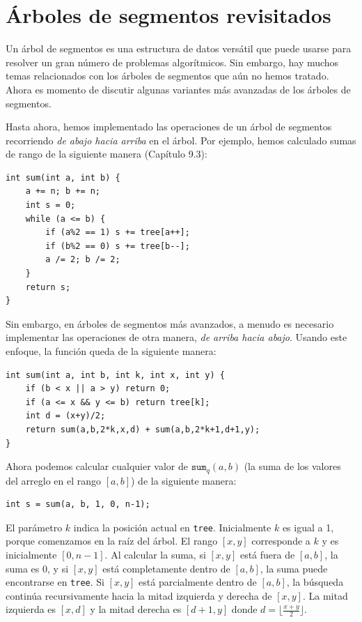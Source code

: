 \chapter{Árboles de segmentos revisitados}


Un árbol de segmentos es una estructura de datos versátil
que puede usarse para resolver un gran número de problemas algorítmicos.
Sin embargo, hay muchos temas relacionados con los árboles de segmentos
que aún no hemos tratado.
Ahora es momento de discutir algunas variantes más avanzadas
de los árboles de segmentos.

Hasta ahora, hemos implementado las operaciones
de un árbol de segmentos recorriendo \emph{de abajo hacia arriba}
en el árbol.
Por ejemplo, hemos calculado
sumas de rango de la siguiente manera (Capítulo 9.3):

\begin{lstlisting}
int sum(int a, int b) {
    a += n; b += n;
    int s = 0;
    while (a <= b) {
        if (a%2 == 1) s += tree[a++];
        if (b%2 == 0) s += tree[b--];
        a /= 2; b /= 2;
    }
    return s;
}
\end{lstlisting}

Sin embargo, en árboles de segmentos más avanzados,
a menudo es necesario implementar las operaciones
de otra manera, \emph{de arriba hacia abajo}.
Usando este enfoque, la función queda de la siguiente manera:
\begin{lstlisting}
int sum(int a, int b, int k, int x, int y) {
    if (b < x || a > y) return 0;
    if (a <= x && y <= b) return tree[k];
    int d = (x+y)/2;
    return sum(a,b,2*k,x,d) + sum(a,b,2*k+1,d+1,y);
}
\end{lstlisting}

Ahora podemos calcular cualquier valor de $\texttt{sum}_q(a,b)$
(la suma de los valores del arreglo en el rango $[a,b]$) de la siguiente manera:
\begin{lstlisting}
int s = sum(a, b, 1, 0, n-1);
\end{lstlisting}

El parámetro $k$ indica la posición actual
en \texttt{tree}.
Inicialmente $k$ es igual a 1, porque comenzamos
en la raíz del árbol.
El rango $[x,y]$ corresponde a $k$
y es inicialmente $[0,n-1]$.
Al calcular la suma,
si $[x,y]$ está fuera de $[a,b]$,
la suma es 0,
y si $[x,y]$ está completamente dentro de $[a,b]$,
la suma puede encontrarse en \texttt{tree}.
Si $[x,y]$ está parcialmente dentro de $[a,b]$,
la búsqueda continúa recursivamente hacia la
mitad izquierda y derecha de $[x,y]$.
La mitad izquierda es $[x,d]$
y la mitad derecha es $[d+1,y]$
donde $d=\lfloor \frac{x+y}{2} \rfloor$.

